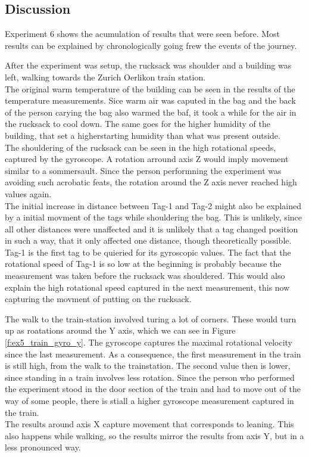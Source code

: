 \subsection{Discussion}
\label{ss:exp6_conclusion}
Experiment 6 shows the acumulation of results that were seen before.
Most results can be explained by chronologically going frew the events of the journey.


After the experiment was setup, the rucksack was shoulder and a building was left, walking towards the Zurich Oerlikon train station.\\
The original warm temperature of the building can be seen in the results of the temperature measurements. 
Sice warm air was caputed in the bag and the back of the person carying the bag also warmed the baf, it took a while for the air in the rucksack to cool down.
The same goes for the higher humidity of the building, that set a higherstarting humidity than what was present outside. \\
The shouldering of the rucksack can be seen in the high rotational speeds, captured by the gyroscope.
A rotation arround axis Z would imply movement similar to a sommersault.
Since the person performning the experiment was avoiding such acrobatic feats, the rotation around the Z axis never reached high values again.\\
The initial increase in distance between Tag-1 and Tag-2 might also be explained by a initial movment of the tags while shouldering the bag.
This is unlikely, since all other distances were unaffected and it is unlikely that a tag changed position in such a way, that it only affected one distance, though theoretically possible.\\
Tag-1 is the first tag to be quieried for its gyroscopic values.
The fact that the rotational speed of Tag-1 is so low at the beginning is probably because the measurement was taken before the rucksack was shouldered.
This would also explain the high rotational speed captured in the next measurement, this now capturing the movment of putting on the rucksack.


The walk to the train-station involved turing a lot of corners.
These would turn up as roatations around the Y axis, which we can see in Figure \ref{f:ex5_train_gyro_y}.
The gyroscope captures the maximal rotational velocity since the last measurement.
As a consequence, the first measurement in the train is still high, from the walk to the trainstation.
The second value then is lower, since standing in a train involves less rotation.
Since the person who performed the experiment stood in the door section of the train and had to move out of the way of some people, there is stiall a higher gyroscope measurement captured in the train. \\
The results around axis X capture movement that corresponds to leaning. This also happens while walking, so the results mirror the results from axis Y, but in a less pronounced way.


